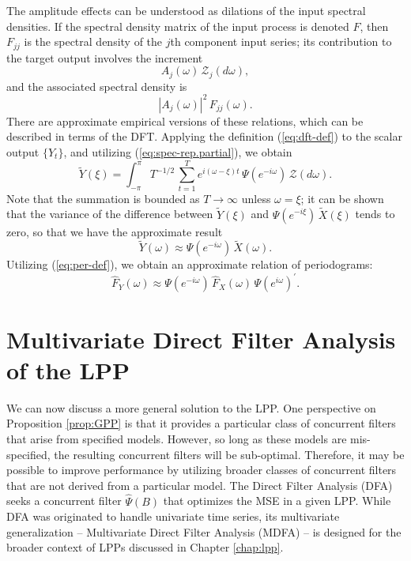 \documentclass[a4paper]{book}
\def\tends{\rightarrow}
\begin{document}
\vspace{.5cm}

The amplitude effects can be understood as dilations of the input spectral densities.  
 If the spectral density matrix of the input process is denoted $F$, then $F_{jj}$
 is the spectral density of the $j$th component input series; its contribution to
 the target output involves the increment
\[
 A_j ( \omega ) \,    \mathcal{Z}_j (d\omega),
\]
 and the associated spectral density is
\[
  {| A_j (\omega) |}^2 \, F_{jj} (\omega).
\]
 There are approximate empirical versions of these relations, which can be described in  
 terms of the DFT.  Applying the definition (\ref{eq:dft-def}) to the 
 scalar output $\{ Y_t \}$,
  and utilizing (\ref{eq:spec-rep.partial}), we obtain
\[
  \widetilde{Y} (\xi) = \int_{-\pi}^{\pi} T^{-1/2} \, \sum_{t=1}^T e^{i (\omega - \xi) t}
 \, \Psi (e^{-i \omega}) \, \mathcal{Z} (d\omega).
\]
  Note that the summation is bounded as $T \tends \infty$ unless $\omega = \xi$; it can be shown
 that the variance of the difference between $\widetilde{Y} (\xi)$ and 
 $\Psi(e^{-i \xi}) \, \widetilde{X} (\xi)$ tends to zero, so that we have the approximate result
\begin{equation}
\label{convolution-dft}
  \widetilde{Y} (\omega) \approx \Psi(e^{-i \omega}) \, \widetilde{X} (\omega).
\end{equation}
  Utilizing (\ref{eq:per-def}), we obtain an approximate relation of periodograms:
\begin{equation}
 \label{convolution-per}
  \widehat{F}_Y (\omega) \approx  \Psi(e^{-i \omega}) \, \widehat{F}_X (\omega) \, 
  {   \Psi(e^{i \omega})  }^{\prime}.
\end{equation}
  
  



\section{Multivariate Direct Filter Analysis of the LPP}

 We can now discuss a more general solution to the LPP.
 One perspective on  Proposition \ref{prop:GPP} is that it provides a
 particular class of concurrent filters that arise from  specified models.  
  However, so long as these models are mis-specified, the resulting
 concurrent filters will be sub-optimal.  Therefore, it may be possible
  to improve performance by  utilizing broader classes of concurrent filters
 that are not derived from a particular model.    
 The Direct Filter Analysis (DFA) seeks a concurrent filter 
 $\widehat{\Psi} (B)$ that optimizes the MSE in a given LPP.
  While   DFA was originated to handle univariate time series, its
 multivariate generalization -- Multivariate Direct Filter Analysis (MDFA) --
 is designed for the broader context of LPPs discussed in Chapter 
  \ref{chap:lpp}.
   
\end{document}
